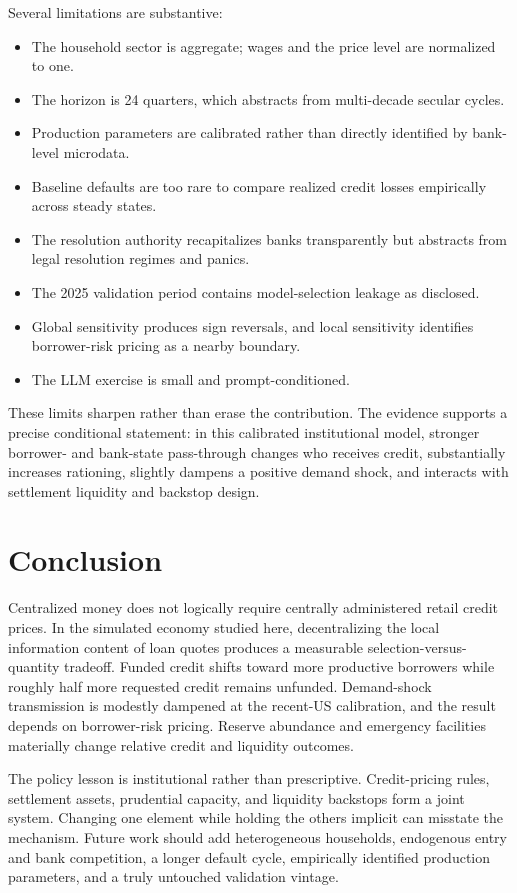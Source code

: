 \documentclass[11pt,a4paper]{article}
\begin{document}
Several limitations are substantive:
\begin{itemize}
    \item The household sector is aggregate; wages and the price level are normalized to one.
    \item The horizon is 24 quarters, which abstracts from multi-decade secular cycles.
    \item Production parameters are calibrated rather than directly identified by bank-level microdata.
    \item Baseline defaults are too rare to compare realized credit losses empirically across steady states.
    \item The resolution authority recapitalizes banks transparently but abstracts from legal resolution regimes and panics.
    \item The 2025 validation period contains model-selection leakage as disclosed.
    \item Global sensitivity produces sign reversals, and local sensitivity identifies borrower-risk pricing as a nearby boundary.
    \item The LLM exercise is small and prompt-conditioned.
\end{itemize}

These limits sharpen rather than erase the contribution. The evidence supports a precise conditional statement: in this calibrated institutional model, stronger borrower- and bank-state pass-through changes who receives credit, substantially increases rationing, slightly dampens a positive demand shock, and interacts with settlement liquidity and backstop design.

\section{Conclusion}

Centralized money does not logically require centrally administered retail credit prices. In the simulated economy studied here, decentralizing the local information content of loan quotes produces a measurable selection-versus-quantity tradeoff. Funded credit shifts toward more productive borrowers while roughly half more requested credit remains unfunded. Demand-shock transmission is modestly dampened at the recent-US calibration, and the result depends on borrower-risk pricing. Reserve abundance and emergency facilities materially change relative credit and liquidity outcomes.

The policy lesson is institutional rather than prescriptive. Credit-pricing rules, settlement assets, prudential capacity, and liquidity backstops form a joint system. Changing one element while holding the others implicit can misstate the mechanism. Future work should add heterogeneous households, endogenous entry and bank competition, a longer default cycle, empirically identified production parameters, and a truly untouched validation vintage.



\end{document}
